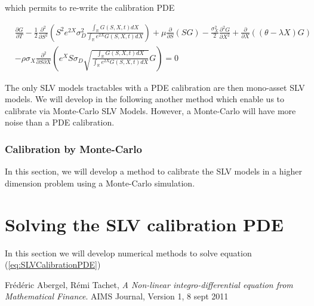 \documentclass{article}
\begin{document}
\noindent which permits to re-write the calibration PDE

\begin{equation}
\begin{aligned}
\label{eq:SLVCalibrationPDE}
	&\frac{\partial G}{\partial T}
	- \frac{1}{2} \frac{\partial^2}{\partial S^2} \left(S^2 e^{2X} \sigma_D^2 \frac{\int_\mathbb{R} G(S,X,t) dX}{\int_\mathbb{R} e^{2X} G(S,X,t) dX}\right)
+ \mu \frac{\partial}{\partial S}\left( S G\right)
- \frac{\sigma_X^2}{2} \frac{\partial^2 G}{\partial X^2}
+ \frac{\partial }{\partial X} \left((\theta - \lambda X) G\right)\\
&- \rho \sigma_X \frac{\partial^2}{\partial S \partial X} \left(e^X S \sigma_D \sqrt{\frac{\int_\mathbb{R} G(S,X,t) dX}{\int_\mathbb{R} e^{2X} G(S,X,t) dX}} G\right) = 0
\end{aligned}
\end{equation}

The only SLV models tractables with a PDE calibration are then mono-asset SLV models. We will develop in the following another method which enable us to calibrate via Monte-Carlo SLV Models. However, a Monte-Carlo will have more noise than a PDE calibration.

\subsubsection{Calibration by Monte-Carlo}
In this section, we will develop a method to calibrate the SLV models in a higher dimension problem using a Monte-Carlo simulation.

\section{Solving the SLV calibration PDE}
In this section we will develop numerical methods to solve equation (\ref{eq:SLVCalibrationPDE})

\begin{thebibliography}{9}

  Frédéric Abergel, Rémi Tachet,
  \emph{A Non-linear integro-differential equation from Mathematical Finance}.
  AIMS Journal,
  Version 1, 8 sept 2011

\end{thebibliography}
\end{document}
